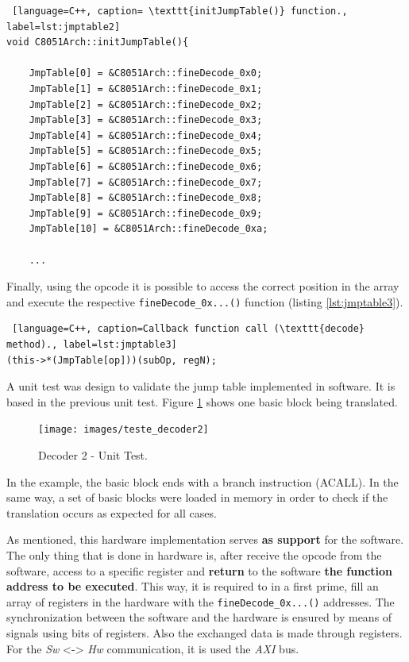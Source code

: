 \documentclass[12pt]{article}
\newcounter{subsubsubsection}[subsubsection]
\begin{document}
{\begin{lstlisting} [language=C++, caption= \texttt{initJumpTable()} function., label=lst:jmptable2]
void C8051Arch::initJumpTable(){

    JmpTable[0] = &C8051Arch::fineDecode_0x0;
    JmpTable[1] = &C8051Arch::fineDecode_0x1;
    JmpTable[2] = &C8051Arch::fineDecode_0x2;
    JmpTable[3] = &C8051Arch::fineDecode_0x3;
    JmpTable[4] = &C8051Arch::fineDecode_0x4;
    JmpTable[5] = &C8051Arch::fineDecode_0x5;
    JmpTable[6] = &C8051Arch::fineDecode_0x6;
    JmpTable[7] = &C8051Arch::fineDecode_0x7;
    JmpTable[8] = &C8051Arch::fineDecode_0x8;
    JmpTable[9] = &C8051Arch::fineDecode_0x9;
    JmpTable[10] = &C8051Arch::fineDecode_0xa;
    
    ...
\end{lstlisting}

Finally, using the opcode it is possible to access the correct position in the array and execute the respective \texttt{fineDecode\_0x...()} function (listing \ref{lst:jmptable3}).

\begin{lstlisting} [language=C++, caption=Callback function call (\texttt{decode} method)., label=lst:jmptable3]
(this->*(JmpTable[op]))(subOp, regN);
\end{lstlisting}

A unit test was design to validate the jump table implemented in software. It is based in the previous unit test. Figure \ref{fig:teste1_decoder2} shows one basic block being translated.

\begin{figure}[H]
\centerline{
\texttt{[image: images/teste\_decoder2]}
}
\caption{Decoder 2 - Unit Test.}
\label{fig:teste1_decoder2} 
\end{figure}

In the example, the basic block ends with a branch instruction (ACALL). In the same way, a set of basic blocks were loaded in memory in order to check if the translation occurs as expected for all cases. 


As mentioned, this hardware implementation serves \textbf{as support} for the software. The only thing that is done in hardware is, after receive the opcode from the software, access to a specific register and \textbf{return} to the software \textbf{the function address to be executed}. This way, it is required to in a first prime, fill an array of registers in the hardware with the \texttt{fineDecode\_0x...()} addresses. The synchronization between the software and the hardware is ensured by means of signals using bits of registers. Also the exchanged data is made through registers. For the \textit{Sw} <-> \textit{Hw} communication, it is used the \textit{AXI} bus.

}
\end{document}
